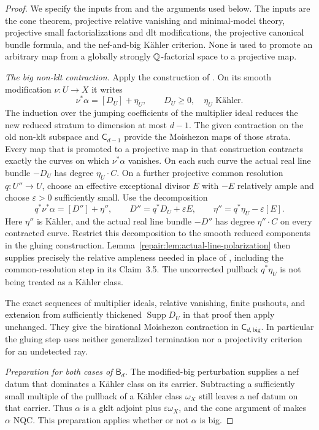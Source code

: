 \begin{proof}
We specify the inputs from \cite{HX2026,HLX2026} and the arguments
used below. The inputs are the cone theorem, projective
relative vanishing and minimal-model theory, projective small
factorializations and dlt modifications, the projective canonical
bundle formula, and the nef-and-big K\"ahler criterion. None is
used to promote an arbitrary map from a globally strongly
$\mathbb Q$-factorial space to a projective map.

\smallskip\noindent
\emph{The big non-klt contraction.}
Apply the construction of \cite[Section~3]{HX2026}. On its smooth
modification $\nu:U\to X$ it writes
\[
 \nu^*\alpha=[D_U]+\eta_U,
 \qquad D_U\geq0,\quad \eta_U\text{ K\"ahler}.
\]
The induction over the jumping coefficients of the multiplier
ideal reduces the new reduced stratum to dimension at most $d-1$.
The given contraction on the old non-klt subspace and
$\mathsf C_{d-1}$ provide the Moishezon maps of those strata.
Every map that is promoted to a projective map in that construction
contracts exactly the curves on which $\nu^*\alpha$ vanishes.
On each such curve the actual real line bundle $-D_U$ has degree
$\eta_U\cdot C$. On a further projective common resolution
$q:U''\to U$, choose an effective exceptional divisor $E$ with
$-E$ relatively ample and choose $\varepsilon>0$ sufficiently small.
Use the decomposition
\[
 q^*\nu^*\alpha=[D'']+\eta'',\qquad
 D''=q^*D_U+\varepsilon E,\qquad
 \eta''=q^*\eta_U-\varepsilon[E].
\]
Here $\eta''$ is K\"ahler, and the actual real line bundle $-D''$
has degree $\eta''\cdot C$ on every contracted curve. Restrict this
decomposition to the smooth reduced components in the gluing
construction. Lemma~\ref{repair:lem:actual-line-polarization} then supplies
precisely the relative ampleness needed in place of
\cite[Lemma~2.42]{HX2026}, including the common-resolution step in its
Claim~3.5. The uncorrected pullback $q^*\eta_U$ is not being treated
as a K\"ahler class.

The exact sequences of multiplier ideals, relative vanishing,
finite pushouts, and extension from sufficiently thickened
$\operatorname{Supp}D_U$ in that proof then apply unchanged.
They give the birational Moishezon contraction in
$\mathsf C_{d,\mathrm{big}}$. In particular the gluing step uses
neither generalized termination nor a projectivity criterion for
an undetected ray.

\smallskip\noindent
\emph{Preparation for both cases of $\mathsf B_d$.}
The modified-big perturbation
\cite[Lemma~2.23]{HX2026} supplies a nef datum that dominates a
K\"ahler class on its carrier. Subtracting a sufficiently small
multiple of the pullback of a K\"ahler class $\omega_X$ still leaves
a nef datum on that carrier. Thus
$\alpha$ is a gklt adjoint plus $\varepsilon\omega_X$, and the cone
argument of \cite[Lemma~2.45]{HX2026} makes $\alpha$ NQC.
This preparation applies whether or not $\alpha$ is big.


\end{proof}
